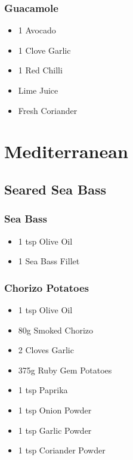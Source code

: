 \documentclass[11pt, english]{article}
\begin{document}
		\subsubsection*{Guacamole}

	\begin{itemize}
        \setlength\itemsep{0cm}
                \item 1 Avocado
		\item 1 Clove Garlic
		\item 1 Red Chilli
		\item Lime Juice
		\item Fresh Coriander
        \end{itemize}

\newpage

\section{Mediterranean}

	\subsection{Seared Sea Bass}

		\subsubsection*{Sea Bass}

	\begin{itemize}
        \setlength\itemsep{0cm}
                \item 1 tsp Olive Oil
		\item 1 Sea Bass Fillet
        \end{itemize}

		\subsubsection*{Chorizo Potatoes}

	\begin{itemize}
        \setlength\itemsep{0cm}
                \item 1 tsp Olive Oil
		\item 80g Smoked Chorizo
		\item 2 Cloves Garlic
		\item 375g Ruby Gem Potatoes
		\item 1 tsp Paprika
		\item 1 tsp Onion Powder 
		\item 1 tsp Garlic Powder
		\item 1 tsp Coriander Powder
        \end{itemize}
\end{document}
